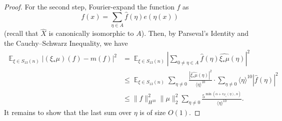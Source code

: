 \documentclass[11pt]{amsart}
\theoremstyle{definition}
\DeclareMathOperator*{\E}{\mathbb{E}}
\begin{document}
\begin{proof}
For the second step, Fourier-expand the function $f$ as
$$f(x) = \sum_{\eta \in A} \widehat{f}(\eta)e(\eta(x))$$
(recall that $\widehat X$ is canonically isomorphic to $A$).  Then, by Parseval's Identity and the Cauchy--Schwarz Inequality, we have
\begin{align*}
\E_{\xi \in S_{13}(n)} |(\xi_* \mu)(f) - m(f)|^2 &= \E_{\xi \in S_{13}(n)}\left|\sum_{0 \neq \eta \in A} \widehat{f}(\eta) \widehat{\xi_*\mu}(\eta)\right|^2 \\
&\le \E_{\xi \in S_{13}(n)} \sum_{\eta \neq 0} \frac{|\widehat{\xi_*\mu}(\eta)|^2}{\langle \eta \rangle^{10}} \cdot \sum_{\eta \neq 0} \langle \eta \rangle^{10} |\widehat{f}(\eta)|^2 \\
&\le \|f\|_{H^{10}}^2\|\mu\|_2^2 \sum_{\eta \neq 0} \frac{5^{\min(\alpha+v_{P_5}(\eta),n)}}{\langle \eta \rangle^{10}}.
\end{align*}
It remains to show that the last sum over $\eta$ is of size $O(1)$.


\end{proof}
\end{document}
